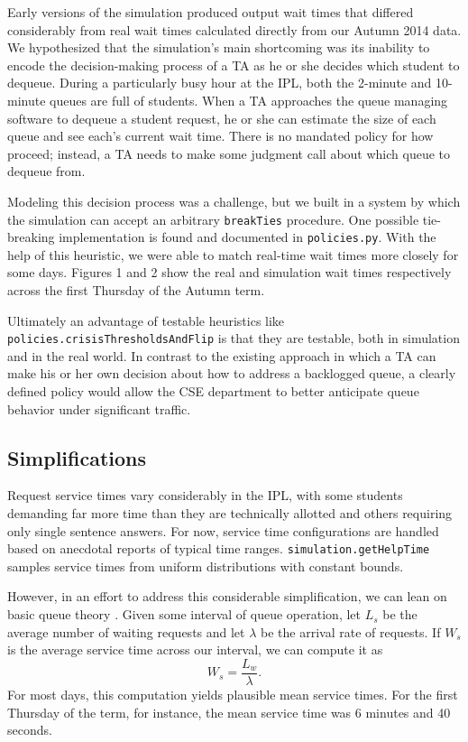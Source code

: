 \documentclass{article}
\begin{document}
\begin{multicols}{2}
Early versions of the simulation produced output wait times that differed considerably from real wait times calculated directly from our Autumn 2014 data. We hypothesized that the simulation's main shortcoming was its inability to encode the decision-making process of a TA as he or she decides which student to dequeue. During a particularly busy hour at the IPL, both the 2-minute and 10-minute queues are full of students. When a TA approaches the queue managing software to dequeue a student request, he or she can estimate the size of each queue and see each's current wait time. There is no mandated policy for how proceed; instead, a TA needs to make some judgment call about which queue to dequeue from.

Modeling this decision process was a challenge, but we built in a system by which the simulation can accept an arbitrary \texttt{breakTies} procedure. One possible tie-breaking implementation is found and documented in \texttt{policies.py}. With the help of this heuristic, we were able to match real-time wait times more closely for some days. Figures 1 and 2 show the real and simulation wait times respectively across the first Thursday of the Autumn term.

Ultimately an advantage of testable heuristics like \texttt{policies.crisisThresholdsAndFlip} is that they are testable, both in simulation and in the real world. In contrast to the existing approach in which a TA can make his or her own decision about how to address a backlogged queue, a clearly defined policy would allow the CSE department to better anticipate queue behavior under significant traffic.

\subsection*{Simplifications}

Request service times vary considerably in the IPL, with some students demanding far more time than they are technically allotted and others requiring only single sentence answers. For now, service time configurations are handled based on anecdotal reports of typical time ranges. \texttt{simulation.getHelpTime} samples service times from uniform distributions with constant bounds.

However, in an effort to address this considerable simplification, we can lean on basic queue theory \cite{winston}. Given some interval of queue operation, let $L_s$ be the average number of waiting requests and let $\lambda$ be the arrival rate of requests. If $W_s$ is the average service time across our interval, we can compute it as
\begin{equation}
W_s = \frac{L_w}{\lambda}.
\end{equation}
For most days, this computation yields plausible mean service times. For the first Thursday of the term, for instance, the mean service time was 6 minutes and 40 seconds.


\end{multicols}
\end{document}
